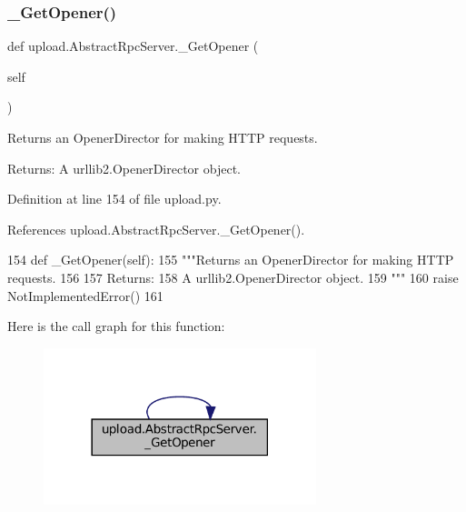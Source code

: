 \subsubsection{\texorpdfstring{\+\_\+\+Get\+Opener()}{\_GetOpener()}\hspace{0.1cm}{\footnotesize\ttfamily [1/2]}}
{\footnotesize\ttfamily def upload.\+Abstract\+Rpc\+Server.\+\_\+\+Get\+Opener (\begin{DoxyParamCaption}\item[{}]{self }\end{DoxyParamCaption})\hspace{0.3cm}{\ttfamily [private]}}

\begin{DoxyVerb}Returns an OpenerDirector for making HTTP requests.

Returns:
  A urllib2.OpenerDirector object.
\end{DoxyVerb}
 

Definition at line 154 of file upload.\+py.



References upload.\+Abstract\+Rpc\+Server.\+\_\+\+Get\+Opener().


\begin{DoxyCode}
154   \textcolor{keyword}{def }\_GetOpener(self):
155     \textcolor{stringliteral}{"""Returns an OpenerDirector for making HTTP requests.}
156 \textcolor{stringliteral}{}
157 \textcolor{stringliteral}{    Returns:}
158 \textcolor{stringliteral}{      A urllib2.OpenerDirector object.}
159 \textcolor{stringliteral}{    """}
160     \textcolor{keywordflow}{raise} NotImplementedError()
161 
\end{DoxyCode}
Here is the call graph for this function\+:
\nopagebreak
\begin{figure}[H]
\begin{center}
\leavevmode
\includegraphics[width=225pt]{classupload_1_1AbstractRpcServer_a388a9974eab1157ba4785e2ab2c33be9_cgraph}
\end{center}
\end{figure}
\mbox{\label{classupload_1_1AbstractRpcServer_a388a9974eab1157ba4785e2ab2c33be9}} 

